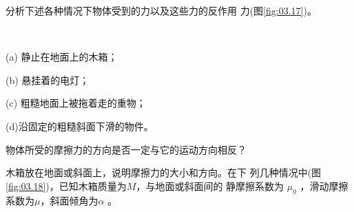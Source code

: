 \begin{questions}

\question 分析下述各种情况下物体受到的力以及这些力的反作用
力(图\ref{fig:03.17})。

\begin{figurex}
    \centering
     \hspace{4em}
    \setcounter{subfigure}{2}
    \\[1em]
    \setcounter{subfigure}{1}
     \hspace{4em}
    \setcounter{subfigure}{3}
    \caption{}
    \label{fig:03.17}
\end{figurex}

(a) 静止在地面上的木箱；

(b) 悬挂着的电灯；

(c) 粗糙地面上被拖着走的重物；

(d)沿固定的粗糙斜面下滑的物件。

\question 物体所受的摩擦力的方向是否一定与它的运动方向相反？

\question 木箱放在地面或斜面上，说明摩擦力的大小和方向。在下
列几种情况中(图\ref{fig:03.18})，已知木箱质量为$ M $，与地面或斜面间的
静摩擦系数为 $ \mu _ { 0 } $  ，滑动摩擦系数为$ \mu $，斜面倾角为$ \alpha $ 。


\end{questions}

